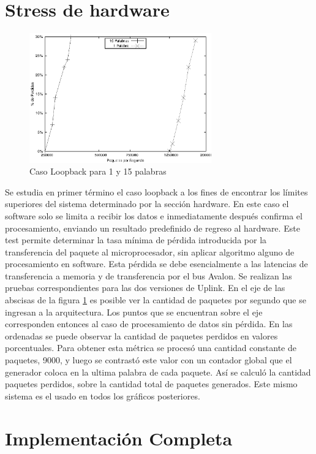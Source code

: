\section{Stress de hardware}
\begin{figure}[h]
  \centering
	\includegraphics[width=0.70\textwidth]{5-resultados/graf/loop.eps}
  \caption{Caso Loopback para 1 y 15 palabras}
  \label{fig:loop}
\end{figure}
Se estudia en primer término el caso loopback a los fines de encontrar los límites superiores del sistema determinado por la sección hardware. En este caso el software solo se limita a recibir los datos e inmediatamente después confirma el procesamiento, enviando un resultado predefinido de regreso al hardware. Este test permite determinar la tasa mínima de pérdida introducida por la transferencia del paquete al microprocesador, sin aplicar algoritmo alguno de procesamiento en software. Esta pérdida se debe esencialmente a las latencias de transferencia a memoria y de transferencia por el bus Avalon. Se realizan las pruebas correspondientes para las dos versiones de Uplink.
En el eje de las abscisas de la figura \ref{fig:loop} es posible ver la cantidad de paquetes por segundo que se ingresan a la arquitectura. Los puntos que se encuentran sobre el eje corresponden entonces al caso de procesamiento de datos sin pérdida. En las ordenadas se puede observar la cantidad de paquetes perdidos en valores porcentuales. Para obtener esta métrica se procesó una cantidad constante de paquetes, 9000, y luego se contrastó este valor con un contador global que el generador coloca en la ultima palabra de cada paquete. Así se calculó la cantidad paquetes perdidos, sobre la cantidad total de paquetes generados. Este mismo sistema es el usado en todos los gráficos posteriores.


\newpage
\section{Implementación Completa}

